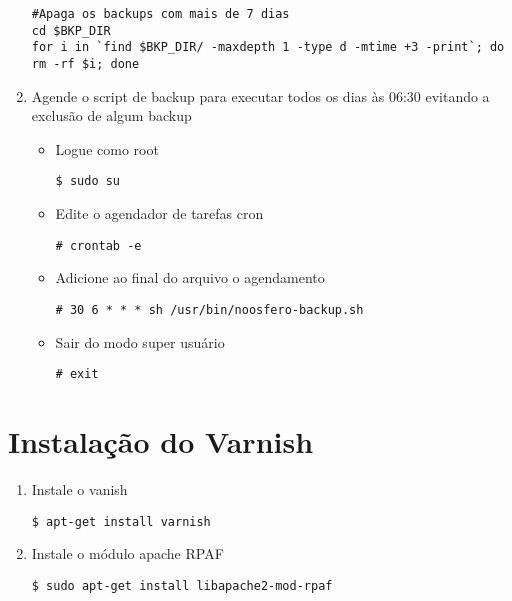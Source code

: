 \begin{enumerate}[label=\alph*)]
\begin{lstlisting}
#Apaga os backups com mais de 7 dias
cd $BKP_DIR
for i in `find $BKP_DIR/ -maxdepth 1 -type d -mtime +3 -print`; do rm -rf $i; done
\end{lstlisting}
\item Agende o script de backup para executar todos os dias às 06:30 evitando a exclusão de algum backup

\begin{itemize}

\item Logue como root
\begin{lstlisting}
$ sudo su
\end{lstlisting}

\item Edite o agendador de tarefas cron
\begin{lstlisting}
# crontab -e
\end{lstlisting}

\item Adicione ao final do arquivo o agendamento
\begin{lstlisting}
# 30 6 * * * sh /usr/bin/noosfero-backup.sh
\end{lstlisting}

\item Sair do modo super usuário
\begin{lstlisting}
# exit
\end{lstlisting}
\end{itemize}
\end{enumerate}

\section{Instalação do Varnish}

\begin{enumerate}[label=\alph*)]
\item Instale o vanish
\begin{lstlisting}
$ apt-get install varnish
\end{lstlisting}

\item Instale o módulo apache RPAF
\begin{lstlisting}
$ sudo apt-get install libapache2-mod-rpaf
\end{lstlisting}
\end{enumerate}

